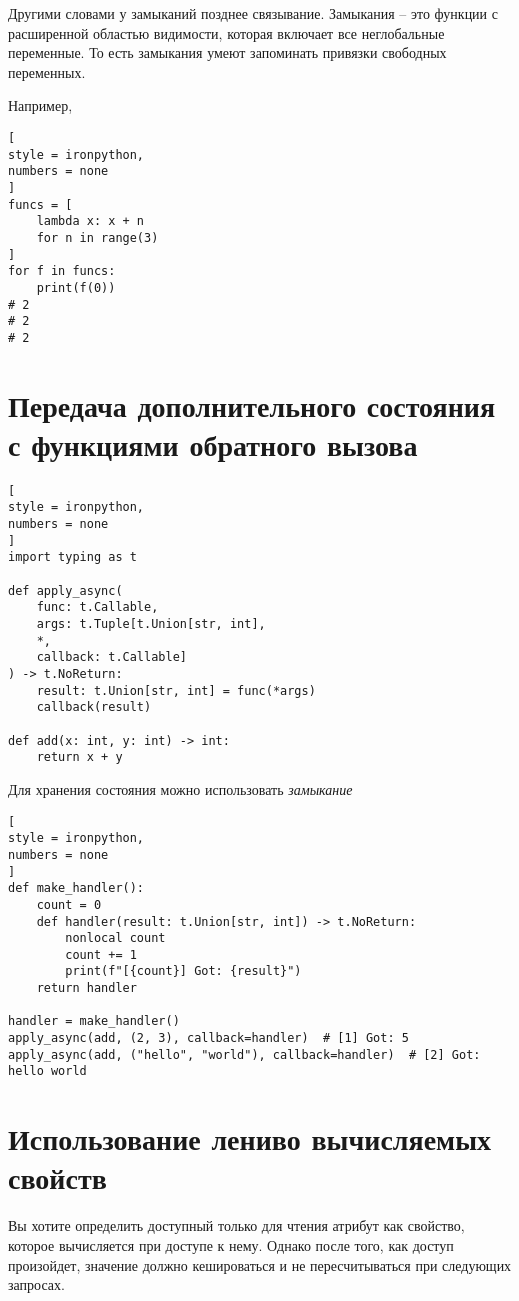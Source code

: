 \documentclass[%
	11pt,
	a4paper,
	utf8,
		]{article}
\begin{document}

Другими словами у замыканий позднее связывание. Замыкания -- это функции с расширенной областью видимости, которая включает все неглобальные переменные. То есть замыкания умеют запоминать привязки свободных переменных.

Например,
\begin{lstlisting}[
style = ironpython,
numbers = none	
]
funcs = [
    lambda x: x + n
    for n in range(3)
]
for f in funcs:
    print(f(0))
# 2
# 2
# 2
\end{lstlisting}

\section{Передача дополнительного состояния с функциями обратного вызова}

\begin{lstlisting}[
style = ironpython,
numbers = none	
]
import typing as t

def apply_async(
    func: t.Callable,
    args: t.Tuple[t.Union[str, int],
    *,
    callback: t.Callable]
) -> t.NoReturn:
    result: t.Union[str, int] = func(*args)
    callback(result)
    
def add(x: int, y: int) -> int:
    return x + y
\end{lstlisting}

Для хранения состояния можно использовать \emph{замыкание} \cite[]{beazley:python_cookbook-2019}
\begin{lstlisting}[
style = ironpython,
numbers = none
]
def make_handler():
    count = 0
    def handler(result: t.Union[str, int]) -> t.NoReturn:
        nonlocal count
        count += 1
        print(f"[{count}] Got: {result}")
    return handler
    
handler = make_handler()
apply_async(add, (2, 3), callback=handler)  # [1] Got: 5
apply_async(add, ("hello", "world"), callback=handler)  # [2] Got: hello world 
\end{lstlisting}

\section{Использование лениво вычисляемых свойств}

Вы хотите определить доступный только для чтения атрибут как свойство, которое вычисляется при доступе к нему. Однако после того, как доступ произойдет, значение должно кешироваться и не пересчитываться при следующих запросах.
\end{document}
